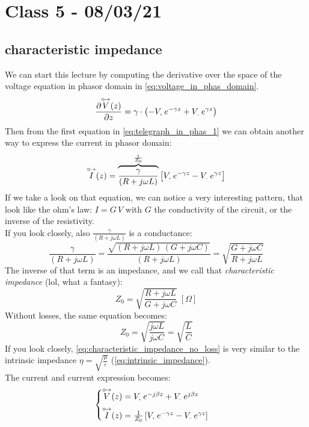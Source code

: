 \section{Class 5 - 08/03/21}
\subsection*{characteristic impedance}
We can start this lecture by computing the derivative over the space of the voltage equation in phasor domain in \cref{eq:voltage_in_phas_domain}.
\begin{equation}
    \frac{\partial \phas{V}(z)}{\partial z}=\gamma \cdot \left(-V\bottomPlus\,e^{-\gamma z}+V\bottomMinus \,e^{\gamma z}\right) 
\end{equation}
Then from the first equation in \cref{eq:telegraph_in_phas_1} we can obtain another way to express the current in phasor domain:
\begin{equation}
    \phas{I}(z)=\overbrace{\frac{\gamma}{(R+j\omega L)}}^{\frac{1}{Z_0}}\left[V\bottomPlus \,e^{-\gamma z}-V\bottomMinus \,e^{\gamma z}\right]
\end{equation}
If we take a look on that equation, we can notice a very interesting pattern, that look like the ohm's law: $I=G\,V$ with $G$ the conductivity of the circuit, or the inverse of the resistivity.\\
If you look closely, also $\frac{\gamma}{(R+j\omega L)}$ is a conductance:
\begin{equation}
    \frac{\gamma}{(R+j\omega L)}=\frac{\sqrt{(R+j\omega L)\,(G+j\omega C)}}{(R+j\omega L)}=\sqrt{\frac{G+j\omega C}{R+j\omega L}}
\end{equation}
The inverse of that term is an impedance, and we call that \emph{characteristic impedance} (lol, what a fantasy):
\begin{equation}
    Z_0=\sqrt{\frac{R+j\omega L}{G+j\omega C}}\;\left[\Omega \right]
\end{equation}
Without losses, the same equation becomes:
\begin{equation} \label{eq:characteristic_impedance_no_loss}
    Z_0=\sqrt{\frac{j\omega L}{j\omega C}}=\sqrt{\frac{L}{C}}
\end{equation}
If you look closely, \cref{eq:characteristic_impedance_no_loss} is very similar to the intrinsic impedance $\eta = \sqrt{\frac{\mu}{\varepsilon}}$ (\cref{eq:intrinsic_impedance}).\\
The current and current expression becomes:
\begin{equation}
    \begin{cases}
    \phas{V}(z) = V\bottomPlus \,e^{-j\beta z}+V\bottomMinus \,e^{j\beta z} \\[5pt]
    \phas{I}(z)=\frac{1}{Z_0}\left[V\bottomPlus \,e^{-\gamma z}-V\bottomMinus \,e^{\gamma z}\right]
    \end{cases}\label{eq:current_and_voltage_in_TL_phas}
\end{equation}
